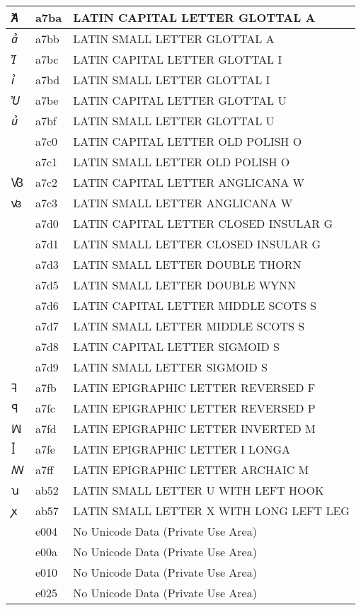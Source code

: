 \documentclass[12pt,letterpaper,openany]{book}
\begin{document}
\begin{center}
\begin{supertabular}{|m{0.25in}|m{0.5in}|m{4in}|}
Ꞻ & a7ba & LATIN CAPITAL LETTER GLOTTAL A\\\hline
ꞻ & a7bb & LATIN SMALL LETTER GLOTTAL A\\\hline
Ꞽ & a7bc & LATIN CAPITAL LETTER GLOTTAL I\\\hline
ꞽ & a7bd & LATIN SMALL LETTER GLOTTAL I\\\hline
Ꞿ & a7be & LATIN CAPITAL LETTER GLOTTAL U\\\hline
ꞿ & a7bf & LATIN SMALL LETTER GLOTTAL U\\\hline
Ꟁ & a7c0 & LATIN CAPITAL LETTER OLD POLISH O\\\hline
ꟁ & a7c1 & LATIN SMALL LETTER OLD POLISH O\\\hline
Ꟃ & a7c2 & LATIN CAPITAL LETTER ANGLICANA W\\\hline
ꟃ & a7c3 & LATIN SMALL LETTER ANGLICANA W\\\hline
Ꟑ & a7d0 & LATIN CAPITAL LETTER CLOSED INSULAR G\\\hline
ꟑ & a7d1 & LATIN SMALL LETTER CLOSED INSULAR G\\\hline
ꟓ & a7d3 & LATIN SMALL LETTER DOUBLE THORN\\\hline
ꟕ & a7d5 & LATIN SMALL LETTER DOUBLE WYNN\\\hline
Ꟗ & a7d6 & LATIN CAPITAL LETTER MIDDLE SCOTS S\\\hline
ꟗ & a7d7 & LATIN SMALL LETTER MIDDLE SCOTS S\\\hline
Ꟙ & a7d8 & LATIN CAPITAL LETTER SIGMOID S\\\hline
ꟙ & a7d9 & LATIN SMALL LETTER SIGMOID S\\\hline
ꟻ & a7fb & LATIN EPIGRAPHIC LETTER REVERSED F\\\hline
ꟼ & a7fc & LATIN EPIGRAPHIC LETTER REVERSED P\\\hline
ꟽ & a7fd & LATIN EPIGRAPHIC LETTER INVERTED M\\\hline
ꟾ & a7fe & LATIN EPIGRAPHIC LETTER I LONGA\\\hline
ꟿ & a7ff & LATIN EPIGRAPHIC LETTER ARCHAIC M\\\hline
ꭒ & ab52 & LATIN SMALL LETTER U WITH LEFT HOOK\\\hline
ꭗ & ab57 & LATIN SMALL LETTER X WITH LONG LEFT LEG\\\hline
 & e004 & No Unicode Data (Private Use Area)\\\hline
 & e00a & No Unicode Data (Private Use Area)\\\hline
 & e010 & No Unicode Data (Private Use Area)\\\hline
 & e025 & No Unicode Data (Private Use Area)\\\hline

\end{supertabular}
\end{center}
\end{document}
